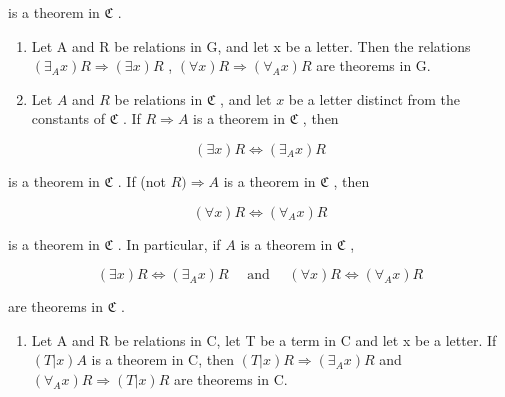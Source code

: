 is a theorem in \(\mathfrak{C}\) .

\begin{enumerate}
\def\labelenumi{\arabic{enumi}.}
\setcounter{enumi}{5}
\item
  Let A and R be relations in G, and let x be a letter. Then the relations \((\exists_{A}x)R \Longrightarrow (\exists x)R\) , \((\forall x)R \Longrightarrow (\forall_{A}x)R\) are theorems in G.
\item
  Let \(A\) and \(R\) be relations in \(\mathfrak{C}\) , and let \(x\) be a letter distinct from the constants of \(\mathfrak{C}\) . If \(R \Longrightarrow A\) is a theorem in \(\mathfrak{C}\) , then
\end{enumerate}

\[
(\exists x) R \Longleftrightarrow (\exists_ {A} x) R
\]

is a theorem in \(\mathfrak{C}\) . If (not \(R) \Longrightarrow A\) is a theorem in \(\mathfrak{C}\) , then

\[
(\forall x) R \Longleftrightarrow (\forall_ {A} x) R
\]

is a theorem in \(\mathfrak{C}\) . In particular, if \(A\) is a theorem in \(\mathfrak{C}\) ,

\[
(\exists x) R \Longleftrightarrow (\exists_ {A} x) R \quad \text { and } \quad (\forall x) R \Longleftrightarrow (\forall_ {A} x) R
\]

are theorems in \(\mathfrak{C}\) .

\begin{enumerate}
\def\labelenumi{\arabic{enumi}.}
\setcounter{enumi}{7}
\tightlist
\item
  Let A and R be relations in C, let T be a term in C and let x be a letter. If \((T|x)A\) is a theorem in C, then \((T|x)R \Longrightarrow (\exists_{A}x)R\) and \((\forall_{A}x)R \Longrightarrow (T|x)R\) are theorems in C.
\end{enumerate}

